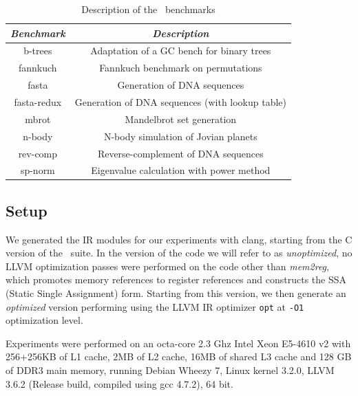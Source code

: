 \begin{table} 
\begin{center}
\begin{small}
    \begin{tabular}{ |c|c| }
        \hline
        {\em Benchmark} & {\em Description} \\ 
        \hline
        \hline
        b-trees & Adaptation of a GC bench for binary trees \\ 
        \hline
        fannkuch & Fannkuch benchmark on permutations \\ 
        \hline
        fasta & Generation of DNA sequences \\ 
        \hline
        fasta-redux & Generation of DNA sequences (with lookup table) \\ 
        \hline
        mbrot & Mandelbrot set generation \\ 
        \hline
        n-body & N-body simulation of Jovian planets \\ 
        \hline
        rev-comp & Reverse-complement of DNA sequences \\ 
        \hline
        sp-norm & Eigenvalue calculation with power method \\ 
        \hline
    \end{tabular} 
\end{small}
\end{center}
\caption{\label{tab:shootout} Description of the \shootout\ benchmarks} 
\end{table}

\subsection{Setup}

We generated the IR modules for our experiments with clang, starting from the C version of the \shootout\ suite. In the version of the code we will refer to as {\em unoptimized}, no LLVM optimization passes were performed on the code other than {\em mem2reg}, which promotes memory references to register references and constructs the SSA (Static Single Assignment) form. Starting from this version, we then generate an {\em optimized} version performing using the LLVM IR optimizer {\tt opt} at {\tt -O1} optimization level.

Experiments were performed on an octa-core 2.3 Ghz Intel Xeon E5-4610 v2 with 256+256KB of L1 cache, 2MB of L2 cache, 16MB of shared L3 cache and 128 GB of DDR3 main memory, running Debian Wheezy 7, Linux kernel 3.2.0, LLVM 3.6.2 (Release build, compiled using gcc 4.7.2), 64 bit.

